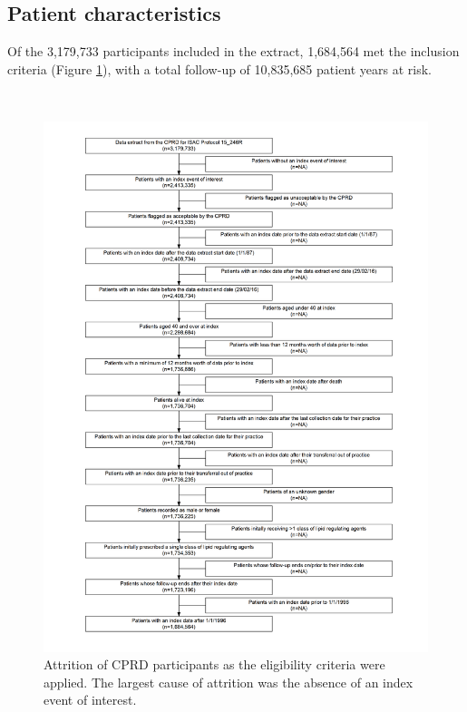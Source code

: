 \documentclass[a4paper, twoside]{templates/ociamthesis}
\begin{document}
\hypertarget{patient-characteristics}{%
\subsection{Patient characteristics}\label{patient-characteristics}}

Of the 3,179,733 participants included in the extract, 1,684,564 met the inclusion criteria (Figure \ref{fig:cprdFlowchart}), with a total follow-up of 10,835,685 patient years at risk.

~





\begin{figure}[H]
\includegraphics[width=1\linewidth]{figures/cprd-analysis/cohort_attrition} \caption[Attrition of CPRD participants]{Attrition of CPRD participants as the eligibility criteria were applied. The largest cause of attrition was the absence of an index event of interest.}\label{fig:cprdFlowchart}
\end{figure}
\end{document}
